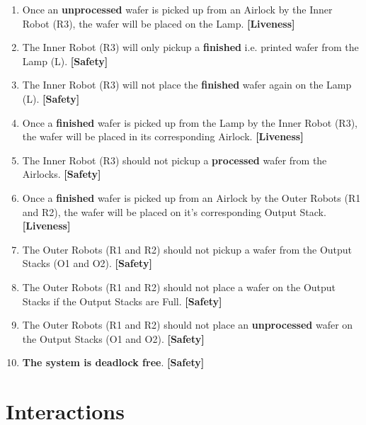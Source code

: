 \documentclass[a4paper,12pt]{article}
\begin{document}
\begin{enumerate}
\begin{enumerate}
		\end{enumerate}
		\item Once an \textbf{unprocessed} wafer is picked up from an Airlock by the Inner Robot (R3), the wafer will be placed on the Lamp. \textbf{[Liveness]}
		\item The Inner Robot (R3) will only pickup a \textbf{finished} i.e. printed wafer from the Lamp (L). \textbf{[Safety]}
		\item The Inner Robot (R3) will not place the \textbf{finished} wafer again on the Lamp (L). \textbf{[Safety]}
		\item Once a \textbf{finished} wafer is picked up from the Lamp by the Inner Robot (R3), the wafer will be placed in its corresponding Airlock. \textbf{[Liveness]}
		\item The Inner Robot (R3) should not pickup a \textbf{processed} wafer from the Airlocks. \textbf{[Safety]}
		\item Once a \textbf{finished} wafer is picked up from an Airlock by the Outer Robots (R1 and R2), the wafer will be placed on it's corresponding Output Stack. \textbf{[Liveness]}
		\item The Outer Robots (R1 and R2) should not pickup a wafer from the Output Stacks (O1 and O2). \textbf{[Safety]}
		\item The Outer Robots (R1 and R2) should not place a wafer on the Output Stacks if the Output Stacks are Full. \textbf{[Safety]}
		\item The Outer Robots (R1 and R2) should not place an \textbf{unprocessed} wafer on the Output Stacks (O1 and O2). \textbf{[Safety]}
		\item \textbf{The system is deadlock free}. \textbf{[Safety]}
		
	\end{enumerate}
	
	\newpage
	\section{Interactions}
\end{document}
